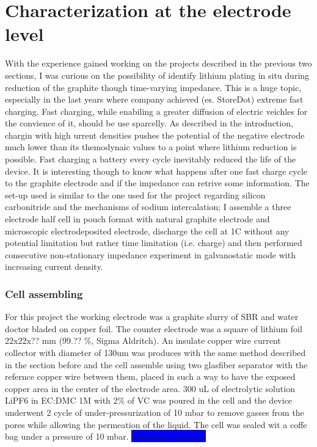 \newpage
\chapter{Characterization at the electrode level}
With the experience gained working on the projects described in the previous two sections, I was curious on the possibility of identify lithium plating in situ during reduction of the graphite though time-varying impedance. This is a huge topic, especially in the last years where company achieved (es. StoreDot) extreme fast charging. Fast charging, while enabiling a greater diffusion of electric veichles for the convience of it, should be use sparcelly. \colorbox{BurntOrange}{As described in the introduction}, chargin with high urrent densities pushes the potential of the negative electrode much lower than its themodynaic values to a point where lithium reduction is possible. Fast charging a battery every cycle inevitably reduced the life of the device. It is interesting though to know what happens after one fast charge cycle to the graphite electrode and if the impedance can retrive some information. The set-up used is similar to the one used for the project regarding silicon carbonitride and the mechanisms of sodium intercalation; I assemble a three electrode half cell in pouch format with natural graphite electrode and microscopic electrodeposited electrode, discharge the cell at 1C without any potential limitation but rather time limitation (i.e. charge) and then performed consecutive non-stationary impedance experiment in galvanostatic mode with increasing current density.

\subsection{Cell assembling}
For this project the working electrode was a graphite slurry of SBR and water doctor bladed on copper foil. The counter electrode was a square of lithium foil 22x22x?? mm (99.?? \%, Sigma Aldritch). An insulate copper wire current collector with diameter of 130um was produces with the same method described in the section before and the cell assemble using two glasfiber separator with the refernce copper wire between them, placed in such a way to have the exposed copper area in the center of the electrode area. 300 uL of electrolytic solution LiPF6 in EC:DMC 1M with 2\% of VC was poured in the cell and the device underwent 2 cycle of under-pressurization of 10 mbar to remove gasses from the pores while allowing the permeation of the liquid. The cell was sealed wit a coffe bag under a pressure of 10 mbar. \colorbox{Blue}{Transform in pascal}

